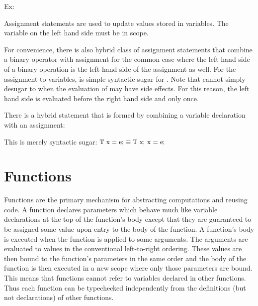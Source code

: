 Ex:


Assignment statements are used to update values stored in variables. The variable on the left hand
side must be in scope.

\grammarbegin
\grmassignstatement

\grmaebasic

\grmlhsbasic

\grammarend

For convenience, there is also hybrid class of assignment statements that
combine a binary operator with assignment for the common case where the left
hand side of a binary operation is the left hand side of the assignment as well.
For the assignment to variables,  is simple syntactic sugar
for . Note that  cannot
simply desugar to  when the evaluation of 
may have side effects. For this reason, the left hand side is
evaluated before the right hand side and only once.

There is a hybrid statement that is formed by combining a variable declaration
with an assignment:

\grammarbegin
{}
\grmdeclexpstatement
\grammarend

This is merely syntactic sugar: $\langtext{T x = e;} \equiv \langtext{T x; x =
e;}$

\section{Functions} Functions are the primary mechanism for abstracting
computations and reusing code. A function declares parameters which behave much
like variable declarations at the top of the function's body except that they
are guaranteed to be assigned some value upon entry to the body of the function.
A function's body is executed when the function is applied to some arguments.
The arguments are evaluated to values in the conventional left-to-right
ordering. These values are then bound to the function's parameters in the same
order and the body of the function is then executed in a new scope where only
those parameters are bound. This means that functions cannot refer to variables
declared in other functions. Thus each function can be typechecked independently
from the definitions (but not declarations) of other functions.

\grammarbegin
\grmcompoundstatement

